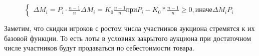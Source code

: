 \begin{equation}
    \begin{cases}
        \Delta M_i = P_i \cdot \frac{n-1}{n} 
        \Delta M_i = K_0 \frac{n-1}{n} \text{при}  P_i- K_0*\frac{n-1}{n} \ge 0, \text{иначе} \Delta M_i  P_i 
    \end{cases}
\end{equation}

Заметим, что скидки игроков с ростом числа участников аукциона стремятся к их базовой функции. То есть лоты в условиях закрытого аукциона при достаточном числе участников будут продаваться по себестоимости товара. 
